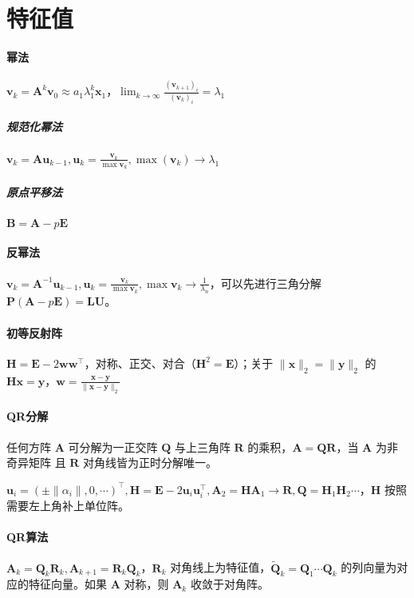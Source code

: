 \documentclass[twocolumn]{ctexart}
\begin{document}

\section{特征值}

\paragraph{幂法} $\mathbf{v}_{k}=\mathbf{A}^{k}\mathbf{v}_0\approx a_1\lambda_1^k\mathbf{x}_1$，$\lim_{k\rightarrow \infty}\frac{(\mathbf{v}_{k+1})_i}{(\mathbf{v}_k)_i}=\lambda_1$
\subparagraph{规范化幂法} $\mathbf{v}_k=\mathbf{A}\mathbf{u}_{k-1},\mathbf{u}_k=\frac{\mathbf{v}_k}{\max\mathbf{v}_k},\max(\mathbf{v}_k)\rightarrow \lambda_1$
\subparagraph{原点平移法} $\mathbf{B}=\mathbf{A}-p\mathbf{E}$

\paragraph{反幂法} $\mathbf{v}_k=\mathbf{A}^{-1}\mathbf{u}_{k-1},\mathbf{u}_k=\frac{\mathbf{v}_k}{\max\mathbf{v}_k},\max\mathbf{v}_k\rightarrow \frac{1}{\lambda_n}$，可以先进行三角分解 $\mathbf{P}(\mathbf{A}-p\mathbf{E})=\mathbf{L}\mathbf{U}$。

\paragraph{初等反射阵} $\mathbf{H}=\mathbf{E}-2\mathbf{w}\mathbf{w}^\top$，对称、正交、对合（$\mathbf{H}^2=\mathbf{E}$）；关于 $\lVert \mathbf{x}\rVert_2=\lVert \mathbf{y}\rVert_2$ 的 $\mathbf{H}\mathbf{x}=\mathbf{y}$，$\mathbf{w}=\frac{\mathbf{x}-\mathbf{y}}{\lVert \mathbf{x}-\mathbf{y}\rVert_2}$

\paragraph{QR分解} 任何方阵 $\mathbf{A}$ 可分解为一正交阵 $\mathbf{Q}$ 与上三角阵 $\mathbf{R}$ 的乘积，$\mathbf{A}=\mathbf{Q}\mathbf{R}$，当 $\mathbf{A}$ 为非奇异矩阵 且 $\mathbf{R}$ 对角线皆为正时分解唯一。

$\mathbf{u}_i=(\pm\lVert\alpha_i\rVert,0,\cdots)^\top,\mathbf{H}=\mathbf{E}-2\mathbf{u}_i\mathbf{u}_i^\top,\mathbf{A}_2=\mathbf{H}\mathbf{A}_1\rightarrow\mathbf{R},\mathbf{Q}=\mathbf{H}_1\mathbf{H}_2\cdots$，$\mathbf{H}$ 按照需要左上角补上单位阵。

\paragraph{QR算法} $\mathbf{A}_k=\mathbf{Q}_k\mathbf{R}_k, \mathbf{A}_{k+1}=\mathbf{R}_k\mathbf{Q}_k$，$\mathbf{R}_k$ 对角线上为特征值，$\tilde{\mathbf{Q}}_k=\mathbf{Q}_1\cdots\mathbf{Q}_k$ 的列向量为对应的特征向量。如果 $\mathbf{A}$ 对称，则 $\mathbf{A}_k$ 收敛于对角阵。


\end{document}

